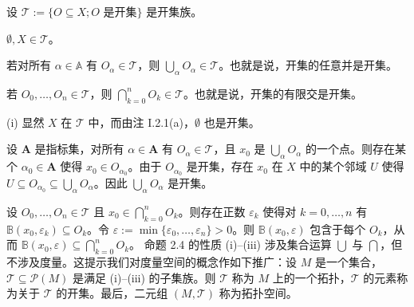 \begin{proposition}

设 $ \mathcal{T} := \{O \subseteq X; O \text{ 是开集}\} $ 是开集族。

\begin{subitems}
\item

$ \emptyset, X \in \mathcal{T} $。

\item

若对所有 $ \alpha \in \mathbb{A} $ 有 $ O_\alpha \in \mathcal{T} $，则 $ \bigcup_\alpha O_\alpha \in \mathcal{T} $。也就是说，开集的任意并是开集。

\item

若 $ O_0, \ldots, O_n \in \mathcal{T} $，则 $ \bigcap_{k=0}^{n} O_k \in \mathcal{T} $。也就是说，开集的有限交是开集。

\proofhead
(i) 显然 $ X $ 在 $ \mathcal{T} $ 中，而由注 I.2.1(a)，$\emptyset$ 也是开集。
\end{subitems}

\begin{subitems}
\item[（ii）]

设 $ \mathbf{A} $ 是指标集，对所有 $ \alpha \in \mathbf{A} $ 有 $ O_\alpha \in \mathcal{T} $，且 $ x_0 $ 是 $ \bigcup_\alpha O_\alpha $ 的一个点。则存在某个 $ \alpha_0 \in \mathbf{A} $ 使得 $ x_0 \in O_{\alpha_0} $。由于 $ O_{\alpha_0} $ 是开集，存在 $ x_0 $ 在 $ X $ 中的某个邻域 $ U $ 使得 $ U \subseteq O_{\alpha_0} \subseteq \bigcup_\alpha O_\alpha $。因此 $ \bigcup_\alpha O_\alpha $ 是开集。

\item[（iii）]

设 $O_0, \ldots, O_n \in \mathcal{T}$ 且 $x_0 \in \bigcap_{k=0}^n O_k$。则存在正数 $\varepsilon_k$ 使得对 $k = 0, \ldots, n$ 有 $\mathbb{B}(x_0, \varepsilon_k) \subseteq O_k$。令 $\varepsilon := \min\{\varepsilon_0, \ldots, \varepsilon_n\} > 0$。则 $\mathbb{B}(x_0, \varepsilon)$ 包含于每个 $O_k$，从而 $\mathbb{B}(x_0, \varepsilon) \subseteq \bigcap_{k=0}^n O_k$。
命题 2.4 的性质 (i)–(iii) 涉及集合运算 $ \bigcup $ 与 $ \bigcap $，但不涉及度量。这提示我们对度量空间的概念作如下推广：设 $ M $ 是一个集合，$ \mathcal{T} \subseteq \mathcal{P}(M) $ 是满足 (i)–(iii) 的子集族。则 $ \mathcal{T} $ 称为 $ M $ 上的一个拓扑，$ \mathcal{T} $ 的元素称为关于 $ \mathcal{T} $ 的开集。最后，二元组 $ (M, \mathcal{T}) $ 称为拓扑空间。

\end{subitems}

\end{proposition}

